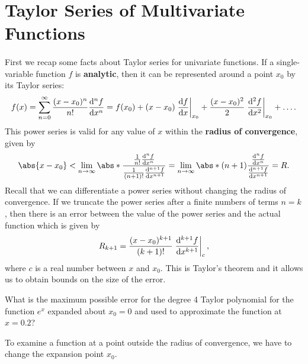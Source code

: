 \documentclass[../multivariate_calculus.tex]{subfiles}
\begin{document}
    \section{Taylor Series of Multivariate Functions}
        \paragraph{}
        First we recap some facts about Taylor series for univariate functions.
        If a single-variable function $f$ is \textbf{analytic}, then it can be represented around a point $x_0$ by its Taylor series:
        \begin{equation}
            f(x)=\sum_{n=0}^\infty\frac{(x-x_0)^n}{n!}\dv[n]{f}{x}=f(x_0)+(x-x_0)\left.\dv{f}{x}\right|_{x_0}+\frac{(x-x_0)^2}{2}\left.\dv[2]{f}{x}\right|_{x_0}+\dots.
        \end{equation}
        This power series is valid for any value of $x$ within the \textbf{radius of convergence}, given by
        \begin{equation}
            \abs{x-x_0}<\lim_{n\to\infty}\abs*{\frac{\frac{1}{n!}\dv[n]{f}{x}}{\frac{1}{(n+1)!}\dv[n+1]{f}{x}}}=\lim_{n\to\infty}\abs*{(n+1)\frac{\dv[n]{f}{x}}{\dv[n+1]{f}{x}}}=R.
        \end{equation}
        Recall that we can differentiate a power series without changing the radius of convergence.
        If we truncate the power series after a finite numbers of terms $n=k$, then there is an error between the value of the power series and the actual function which is given by
        \begin{equation}
            R_{k+1}=\frac{(x-x_0)^{k+1}}{(k+1)!}\left.\dv[k+1]{f}{x}\right|_c,
        \end{equation} 
        where $c$ is a real number between $x$ and $x_0$.
        This is Taylor's theorem and it allows us to obtain bounds on the size of the error.
        \begin{example}
            What is the maximum possible error for the degree 4 Taylor polynomial for the function $e^x$ expanded about $x_0=0$ and used to approximate the function at $x=0.2$?
        \end{example}
        To examine a function at a point outside the radius of convergence, we have to change the expansion point $x_0$.
\end{document}
